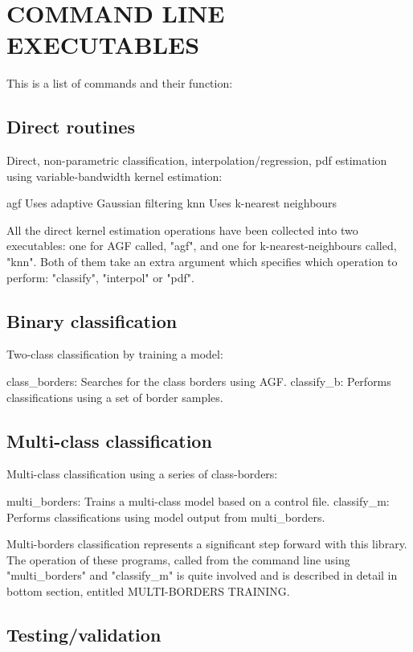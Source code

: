 \documentclass[12pt]{article}
\begin{document}
\section{COMMAND LINE EXECUTABLES}

This is a list of commands and their function:

\subsection{Direct routines}

Direct, non-parametric classification, interpolation/regression, pdf estimation using variable-bandwidth kernel estimation:

  agf			Uses adaptive Gaussian filtering
  knn			Uses k-nearest neighbours

  All the direct kernel estimation operations have been collected into two executables: one for AGF called, "agf", and one for k-nearest-neighbours called, "knn".  Both of them take an extra argument which specifies which operation to perform: "classify", "interpol" or "pdf".

\subsection{Binary classification}

Two-class classification by training a model:

  class_borders:	Searches for the class borders using AGF.
  classify_b:		Performs classifications using a set of border samples.

\subsection{Multi-class classification}

Multi-class classification using a series of class-borders:

  multi_borders:	Trains a multi-class model based on a control file.
  classify_m:		Performs classifications using model output from multi_borders.

  Multi-borders classification represents a significant step forward with this library.  The operation of these programs, called from the command line using "multi_borders" and "classify_m" is quite involved and is described in detail in bottom section, entitled MULTI-BORDERS TRAINING.

\subsection{Testing/validation}
\end{document}
